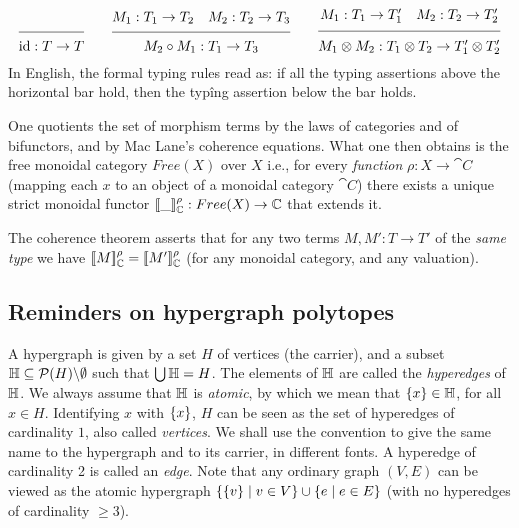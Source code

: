 $$\seq{}{\id:T\rightarrow T}\quad\quad \seq{M_1:T_1\rightarrow T_2\quad M_2:T_2\rightarrow T_3}{M_2\comp M_1:T_1\rightarrow T_3}\quad\quad \seq{M_1:T_1\rightarrow T'_1\quad M_2:T_2\rightarrow T'_2}{M_1\otimes M_2:T_1\otimes T_2\rightarrow T'_1\otimes T'_2}$$
In English, the formal typing rules read as: if all the typing assertions above the horizontal bar hold, then the typîng assertion below the bar holds.

One quotients the set of morphism terms by the laws of categories and of bifunctors, and by Mac Lane's coherence equations.
What one then obtains is the free monoidal category ${Free}(X)$ over $X$ i.e., for every {\em function} $\rho:X\rightarrow \cat{C}$ (mapping each $x$ to an object of  a monoidal category $\cat{C}$) there exists a unique strict monoidal functor $[\![ \_]\!]^\rho_{{\mathbb C}}:{Free}(X)\rightarrow{\mathbb C}$ that extends it.

The coherence theorem asserts that for any two terms $M,M':T\rightarrow T'$  of the {\em same type} we have $[\![ M]\!]^\rho_{{\mathbb C}}=[\![ M']\!]^\rho_{{\mathbb C}}$  (for any monoidal category, and any valuation).



\subsection{Reminders on hypergraph polytopes}

A hypergraph is given by a set  $H$ of vertices (the carrier), and a subset 
${\mathbb H}\subseteq {\mathcal{P}}(H)\backslash\emptyset$ such that $\bigcup {\mathbb H}=H$.
 The elements of ${\mathbb H}$ are called the {\em hyperedges} of ${\mathbb H}$.  
 We always assume that ${\mathbb H}$ is {\em atomic}, by which we mean that 
 $\left\{x\right\}\in {\mathbb H}$, for all $x\in H$. 
 Identifying $x$ with $\left\{x\right\}$, $H$ can be seen as the set of  hyperedges of 
 cardinality $1$, also called {\em vertices}. We shall use the convention to 
 give the same name to the hypergraph and to its carrier, in different fonts. 
A hyperedge of cardinality 2 is called an {\em edge}.  Note that any ordinary graph $(V,E)$ can be viewed as the atomic hypergraph
$\left\{\left\{v\right\} \mid v\in V\right\} \cup \left\{e \mid e\in E\right\}$ (with no hyperedges of cardinality $\geq 3$). 

